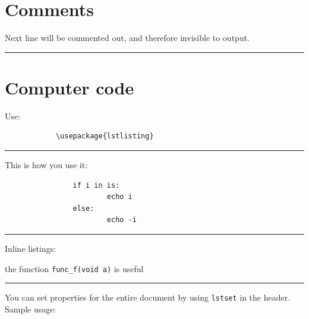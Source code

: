 \documentclass[12pt]{article}
\newcommand{\inOut}[1]{#1}                                %
\begin{document}
\section{Comments}\label{secCom}

    \begin{example} \label{expCom1}
            Next line will be commented out, and therefore invisible to output.

    \end{example}\hrule

\section{Computer code}\label{code}

    \begin{remark} \label{remCode1}
        Use:
        \begin{lstlisting}
            \usepackage{lstlisting}
        \end{lstlisting}
    \end{remark}\hrule

    \begin{example} \label{expLst1}
        This is how you use it:
            \begin{lstlisting}
                if i in is:
                        echo i
                else:
                        echo -i
            \end{lstlisting}
    \end{example}\hrule

    \begin{example} \label{expLst2}
        Inline listings:

            the function \lstinline|func_f(void a)| is useful
    \end{example}\hrule

    You can set properties for the entire document by using \lstinline|lstset| in the header.
    Sample usage:
\end{document}

